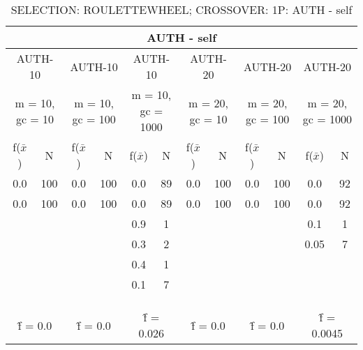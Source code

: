 \begin{table}[H]
	\centering
	\caption{SELECTION: ROULETTEWHEEL; CROSSOVER: 1P: AUTH - self}
	\begin{adjustbox}{width=1\textwidth}
		\begin{tabular}{ |c|c||c|c||c|c||c|c||c|c||c|c| }
			\hline
			\multicolumn{12}{|c|}{AUTH - self} \\
			\hline
			\multicolumn{2}{|c||}{AUTH-10} & \multicolumn{2}{c||}{AUTH-10} & \multicolumn{2}{c||}{AUTH-10} & \multicolumn{2}{c||}{AUTH-20} & \multicolumn{2}{c||}{AUTH-20} & \multicolumn{2}{c|}{AUTH-20}\\
			\hline
			\multicolumn{2}{|c||}{m = 10, gc = 10} & \multicolumn{2}{c||}{m = 10, gc = 100} & \multicolumn{2}{c||}{m = 10, gc = 1000} & \multicolumn{2}{c||}{m = 20, gc = 10} & \multicolumn{2}{c||}{m = 20, gc = 100} & \multicolumn{2}{c|}{m = 20, gc = 1000}\\
			\hline
			f($\bar{x}$) & N & f($\bar{x}$) & N & f($\bar{x}$) & N & f($\bar{x}$) & N & f($\bar{x}$) & N & f($\bar{x}$) & N\\
			\hline
			\hline
			0.0 & 100 & 0.0 & 100 & 0.0 & 89 & 0.0 & 100 & 0.0 & 100 & 0.0 & 92\\
			\hline
			0.0 & 100 & 0.0 & 100 & 0.0 & 89 & 0.0 & 100 & 0.0 & 100 & 0.0 & 92\\
			&   &   &   & 0.9 & 1 &   &   &   &   & 0.1 & 1\\
			&   &   &   & 0.3 & 2 &   &   &   &   & 0.05 & 7\\
			&   &   &   & 0.4 & 1 &   &   &   &   &   &  \\
			&   &   &   & 0.1 & 7 &   &   &   &   &   &  \\
			&   &   &   &   &   &   &   &   &   &   &  \\
			&   &   &   &   &   &   &   &   &   &   &  \\
			&   &   &   &   &   &   &   &   &   &   &  \\
			\hline
			\multicolumn{2}{|c||}{\^{f} = 0.0} & \multicolumn{2}{c||}{\^{f} = 0.0} & \multicolumn{2}{c||}{\^{f} = 0.026} & \multicolumn{2}{c||}{\^{f} = 0.0} & \multicolumn{2}{c||}{\^{f} = 0.0} & \multicolumn{2}{c|}{\^{f} = 0.0045}\\
			\hline
		\end{tabular}
	\end{adjustbox}
\end{table}

